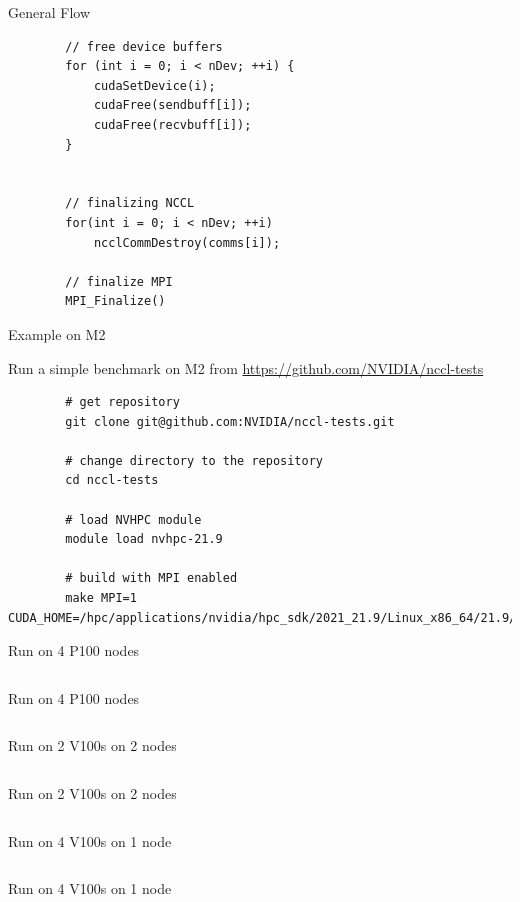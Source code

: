 \begin{frame}[fragile]{General Flow}
	
	\begin{verbatim}
		// free device buffers
		for (int i = 0; i < nDev; ++i) {
			cudaSetDevice(i);
			cudaFree(sendbuff[i]);
			cudaFree(recvbuff[i]);
		}
		
		
		// finalizing NCCL
		for(int i = 0; i < nDev; ++i)
			ncclCommDestroy(comms[i]);
			
		// finalize MPI
		MPI_Finalize()
	\end{verbatim}
\end{frame}

\begin{frame}[fragile]{Example on M2}
	
	Run a simple benchmark on M2 from \url{https://github.com/NVIDIA/nccl-tests}
	
	\begin{verbatim}
		# get repository
		git clone git@github.com:NVIDIA/nccl-tests.git
		
		# change directory to the repository
		cd nccl-tests
		
		# load NVHPC module
		module load nvhpc-21.9
		
		# build with MPI enabled
		make MPI=1 CUDA_HOME=/hpc/applications/nvidia/hpc_sdk/2021_21.9/Linux_x86_64/21.9/cuda/11.4/
	\end{verbatim}
\end{frame}

\begin{frame}[fragile]{Run on 4 P100 nodes }
	\inputminted{sh}{examples/nccl/p100x4.sbatch}
\end{frame}

\begin{frame}[fragile]{Run on 4 P100 nodes }
	\inputminted{sh}{examples/nccl/p100x4.txt}
\end{frame}

\begin{frame}[fragile]{Run on 2 V100s on 2 nodes }
	\inputminted{sh}{examples/nccl/v100_2x2.sbatch}
\end{frame}

\begin{frame}[fragile]{Run on 2 V100s on 2 nodes}
	\inputminted{sh}{examples/nccl/v100_2x2.txt}
\end{frame}

\begin{frame}[fragile]{Run on 4 V100s on 1 node }
	\inputminted{sh}{examples/nccl/v100_4x1.sbatch}
\end{frame}

\begin{frame}[fragile]{Run on 4 V100s on 1 node}
	\inputminted{sh}{examples/nccl/v100_4x1.txt}
\end{frame}

